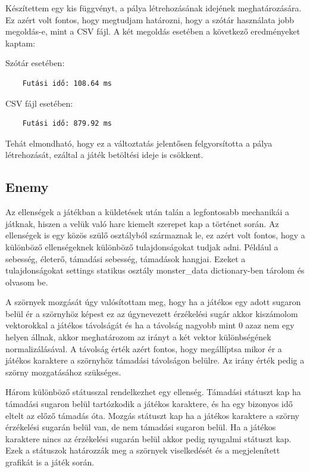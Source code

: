 Készítettem egy kis függvényt, a pálya létrehozásának idejének meghatározására. Ez azért volt fontos, hogy megtudjam határozni, hogy a szótár használata jobb megoldás-e, mint a CSV fájl. A két megoldás esetében a következő eredményeket kaptam:

Szótár esetében:
\begin{verbatim}
    Futási idő: 108.64 ms
\end{verbatim}
CSV fájl esetében:
\begin{verbatim}
    Futási idő: 879.92 ms
\end{verbatim}

Tehát elmondható, hogy ez a változtatás jelentősen felgyorsította a pálya létrehozását, ezáltal a játék betöltési ideje is csökkent.

\subsection{Enemy}

Az ellenségek a játékban a küldetések után talán a legfontosabb mechanikái a játknak, hiszen a velük való harc kiemelt szerepet kap a történet során.
Az ellenségek is egy közös szülő osztályból származnak le, ez azért volt fontos, hogy a különböző ellenségeknek különböző tulajdonságokat tudjak adni. Például a sebesség, életerő, támadási sebesség, támadások hangjai. Ezeket a tulajdonságokat settings statikus osztály monster\_data dictionary-ben tárolom és olvasom be.

A szörnyek mozgását úgy valósítottam meg, hogy ha a játékos egy adott sugaron belül ér a szörnyhöz képest ez az úgynevezett érzékelési sugár akkor kiszámolom vektorokkal a játékos távolságát és ha a távolság nagyobb mint 0 azaz nem egy helyen állnak, akkor meghatározom az irányt a két vektor különbségének normalizálásával. A távolság érték azért fontos, hogy megállíptsa mikor ér a játékos karaktere a szörnyhöz támadási távolságon belülre. Az irány érték pedig a szörny mozgatásához szükséges.

Három különböző státusszal rendelkezhet egy ellenség. Támadási státuszt kap ha támadási sugaron belül tartózkodik a játékos karaktere, és ha egy bizonyos idő eltelt az előző támadás óta. Mozgás státuszt kap ha a játékos karaktere a szörny érzékelési sugarán belül van, de nem támadási sugaron belül. Ha a játékos karaktere nincs az érzékelési sugarán belül akkor pedig nyugalmi státuszt kap. Ezek a státuszok határozzák meg a szörnyek viselkedését és a megjelenített grafikát is a játék során.


